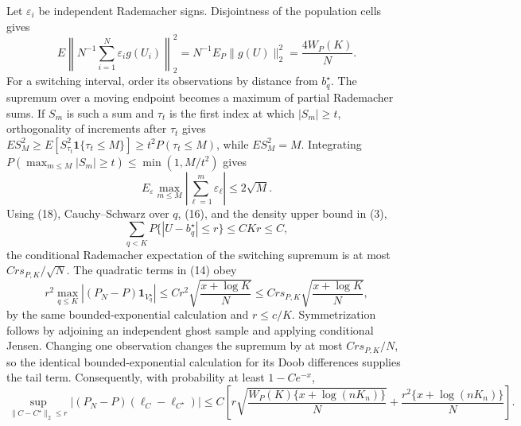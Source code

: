 Let \(\varepsilon_i\) be independent Rademacher signs.  Disjointness of the population cells gives
\[
 E\left\|N^{-1}\sum_{i=1}^N\varepsilon_i g(U_i)\right\|_2^2
 =N^{-1}E_P\|g(U)\|_2^2=\frac{4W_P(K)}N.                                   \tag{17}
\]
For a switching interval, order its observations by distance from \(b_q^\star\).  The supremum over a moving endpoint becomes a maximum of partial Rademacher sums.  If \(S_m\) is such a sum and \(\tau_t\) is the first index at which \(|S_m|\geq t\), orthogonality of increments after \(\tau_t\) gives \(ES_M^2\geq E[S_{\tau_t}^2\mathbf1\{\tau_t\leq M\}]\geq t^2P(\tau_t\leq M)\), while \(ES_M^2=M\).  Integrating \(P(\max_{m\leq M}|S_m|\geq t)\leq\min(1,M/t^2)\) gives
\[
 E_\varepsilon\max_{m\leq M}\left|\sum_{\ell=1}^m\varepsilon_\ell\right|
 \leq2\sqrt M.                                                               \tag{18}
\]
Using (18), Cauchy--Schwarz over \(q\), (16), and the density upper bound in (3),
\[
 \sum_{q<K}P\{|U-b_q^\star|\leq r\}\leq CKr\leq C,                        \tag{19}
\]
the conditional Rademacher expectation of the switching supremum is at most \(Crs_{P,K}/\sqrt N\).  The quadratic terms in (14) obey
\[
 r^2\max_{q\leq K}|(P_N-P)\mathbf1_{V_q^\star}|
 \leq Cr^2\sqrt{\frac{x+\log K}{N}}
 \leq Crs_{P,K}\sqrt{\frac{x+\log K}{N}},                                 \tag{20}
\]
by the same bounded-exponential calculation and \(r\leq c/K\).  Symmetrization follows by adjoining an independent ghost sample and applying conditional Jensen.  Changing one observation changes the supremum by at most \(Crs_{P,K}/N\), so the identical bounded-exponential calculation for its Doob differences supplies the tail term.  Consequently, with probability at least \(1-Ce^{-x}\),
\[
 \sup_{\|C-C^\star\|_2\leq r}
 |(P_N-P)(\ell_C-\ell_{C^\star})|
 \leq C\left[
 r\sqrt{\frac{W_P(K)\{x+\log(nK_n)\}}N}
 +\frac{r^2\{x+\log(nK_n)\}}N\right].                                    \tag{21}
\]

